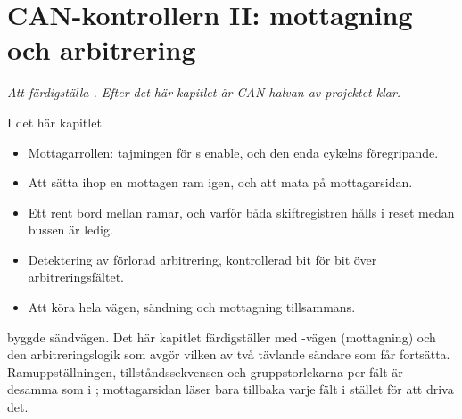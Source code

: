 
\chapter{CAN-kontrollern II: mottagning och arbitrering}
\label{c17:ch}

{\large\itshape Att färdigställa . Efter det här kapitlet är CAN-halvan av
projektet klar.\par}

\begin{chapterbox}{I det här kapitlet}
\begin{itemize}
  \item Mottagarrollen: tajmingen för s enable, och den enda cykelns
    föregripande.
  \item Att sätta ihop en mottagen ram igen, och att mata  på mottagarsidan.
  \item Ett rent bord mellan ramar, och varför båda skiftregistren hålls i reset medan bussen är
    ledig.
  \item Detektering av förlorad arbitrering, kontrollerad bit för bit över arbitreringsfältet.
  \item Att köra  hela vägen, sändning och mottagning tillsammans.
\end{itemize}
\end{chapterbox}

 byggde sändvägen. Det här kapitlet färdigställer  med
-vägen (mottagning) och den arbitreringslogik som avgör vilken av två tävlande
sändare som får fortsätta. Ramuppställningen, tillståndssekvensen och gruppstorlekarna per fält är
desamma som i ; mottagarsidan läser bara tillbaka varje fält i stället för att driva
det.




